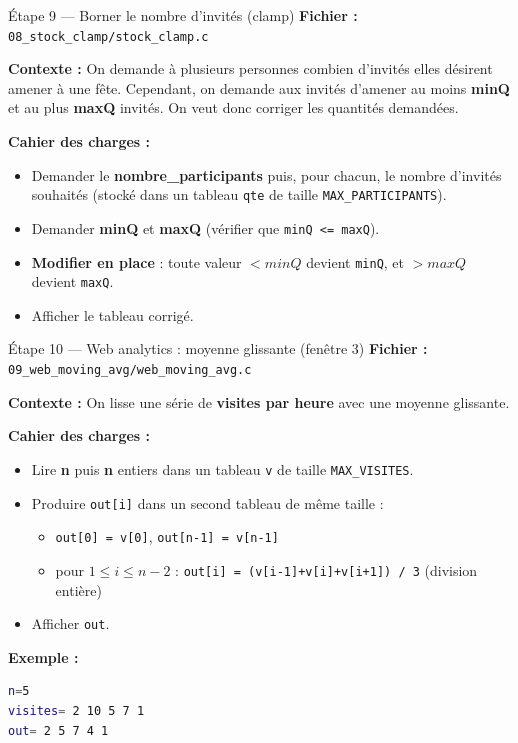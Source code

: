 \begin{UPSTIManipulation}{Étape 9 — Borner le nombre d'invités (clamp)}
  \textbf{Fichier :} \texttt{08\_stock\_clamp/stock\_clamp.c}

  \textbf{Contexte :} On demande à plusieurs personnes combien d'invités elles désirent amener à une fête. Cependant, on demande aux invités d'amener au moins \textbf{minQ} et au plus \textbf{maxQ} invités. On veut donc corriger les quantités demandées.

  \textbf{Cahier des charges :}
  \begin{itemize}
    \item Demander le \textbf{nombre\_participants} puis, pour chacun, le nombre d'invités souhaités (stocké dans un tableau \texttt{qte} de taille \texttt{MAX\_PARTICIPANTS}).
    \item Demander \textbf{minQ} et \textbf{maxQ} (vérifier que \texttt{minQ <= maxQ}).
    \item \textbf{Modifier en place} : toute valeur $<minQ$ devient \texttt{minQ}, et $>maxQ$ devient \texttt{maxQ}.
    \item Afficher le tableau corrigé.
  \end{itemize}

\end{UPSTIManipulation}


\begin{UPSTIManipulation}{Étape 10 — Web analytics : moyenne glissante (fenêtre 3)}
  \textbf{Fichier :} \texttt{09\_web\_moving\_avg/web\_moving\_avg.c}

  \textbf{Contexte :} On lisse une série de \textbf{visites par heure} avec une moyenne glissante.

  \textbf{Cahier des charges :}
  \begin{itemize}
    \item Lire \textbf{n} puis \textbf{n} entiers dans un tableau \texttt{v} de taille \texttt{MAX\_VISITES}.
    \item Produire \texttt{out[i]} dans un second tableau de même taille :
      \begin{itemize}
        \item \texttt{out[0] = v[0]}, \texttt{out[n-1] = v[n-1]}
        \item pour $1 \le i \le n-2$ : \texttt{out[i] = (v[i-1]+v[i]+v[i+1]) / 3} (division entière)
      \end{itemize}
    \item Afficher \texttt{out}.
  \end{itemize}

  \textbf{Exemple :}
  \begin{lstlisting}[language=bash]
n=5
visites= 2 10 5 7 1
out= 2 5 7 4 1
  \end{lstlisting}

\end{UPSTIManipulation}


